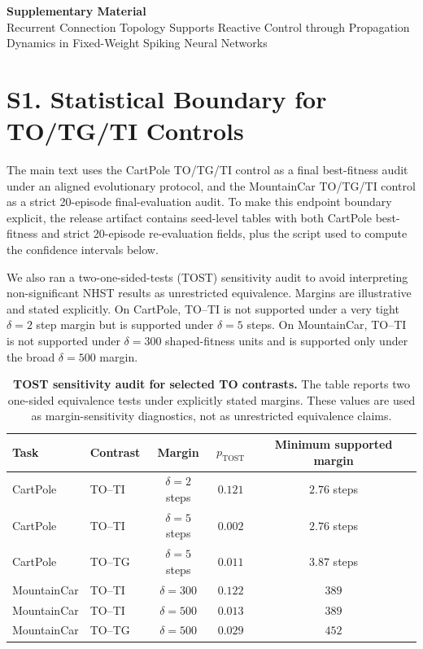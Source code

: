 \documentclass[10pt]{article}
\begin{document}
\begin{center}
{\Large\bfseries Supplementary Material}\\[0.3em]
{\large Recurrent Connection Topology Supports Reactive Control through Propagation Dynamics in Fixed-Weight Spiking Neural Networks}
\end{center}

\section*{S1. Statistical Boundary for TO/TG/TI Controls}

The main text uses the CartPole TO/TG/TI control as a final best-fitness audit
under an aligned evolutionary protocol, and the MountainCar TO/TG/TI control as
a strict 20-episode final-evaluation audit. To make this endpoint boundary
explicit, the release artifact contains seed-level tables with both CartPole
best-fitness and strict 20-episode re-evaluation fields, plus the script used to
compute the confidence intervals below.

We also ran a two-one-sided-tests (TOST) sensitivity audit to avoid interpreting
non-significant NHST results as unrestricted equivalence. Margins are
illustrative and stated explicitly. On CartPole, TO--TI is not supported under a very tight
$\delta=2$ step margin but is supported under $\delta=5$ steps. On
MountainCar, TO--TI is not supported under $\delta=300$ shaped-fitness units
and is supported only under the broad $\delta=500$ margin.


\begin{table}[H]
\centering
\footnotesize
\caption{\textbf{TOST sensitivity audit for selected TO contrasts.} The table
reports two one-sided equivalence tests under explicitly stated margins. These
values are used as margin-sensitivity diagnostics, not as unrestricted
equivalence claims.}
\begin{tabular}{@{}llccc@{}}
\toprule
\textbf{Task} & \textbf{Contrast} & \textbf{Margin} & \textbf{$p_\mathrm{TOST}$} & \textbf{Minimum supported margin} \\
\midrule
CartPole & TO--TI & $\delta=2$ steps & $0.121$ & $2.76$ steps \\
CartPole & TO--TI & $\delta=5$ steps & $0.002$ & $2.76$ steps \\
CartPole & TO--TG & $\delta=5$ steps & $0.011$ & $3.87$ steps \\
MountainCar & TO--TI & $\delta=300$ & $0.122$ & $389$ \\
MountainCar & TO--TI & $\delta=500$ & $0.013$ & $389$ \\
MountainCar & TO--TG & $\delta=500$ & $0.029$ & $452$ \\
\bottomrule
\end{tabular}
\end{table}
\end{document}
